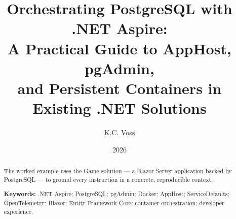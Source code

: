 \documentclass[12pt,a4paper]{article}
\title{Orchestrating PostgreSQL with .NET Aspire:\\ A Practical Guide to AppHost, pgAdmin,\\ and Persistent Containers in Existing .NET Solutions}
\author{K.C. Voss}
\date{2026}
\begin{document}
\maketitle

\begin{abstract}
\noindent
The worked example uses the Game solution --- a Blazor Server application backed by PostgreSQL --- to ground every instruction in a concrete, reproducible context.

\vspace{0.5em}
\noindent\textbf{Keywords:} .NET Aspire; PostgreSQL; pgAdmin; Docker; AppHost; ServiceDefaults; OpenTelemetry; Blazor; Entity Framework Core; container orchestration; developer experience.
\end{abstract}

\tableofcontents
\bigskip











\end{document}
